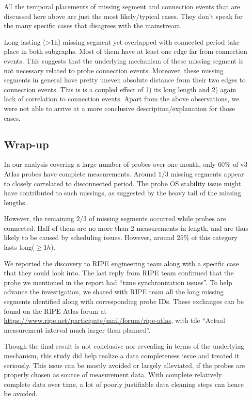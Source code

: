 All the temporal placements of missing segment and connection events that are discussed here above are just the most likely/typical cases. They don't speak for the many specific cases that disagrees with the mainstream.

Long lasting (>1h) missing segment yet overlapped with connected period take place in both subgraphs. 
Most of them have at least one edge far from connection events.
This suggests that the underlying mechanism of these missing segment is not necessary related to probe connection events.
Moreover, these missing segments in general have pretty uneven absolute distance from their two edges to connection events. 
This is is a coupled effect of 1) its long length and 2) again lack of correlation to connection events.
Apart from the above observations, we were not able to arrive at a more conclusive description/explanation for those cases.

\subsection*{Wrap-up}
In our analysis covering a large number of probes over one month, only 60\% of v3 Atlas probes have complete measurements. Around $1/3$ missing segments appear to closely correlated to disconnected period. The probe OS stability issue might have contributed to such missings, as suggested by the heavy tail of the missing lengths.

However, the remaining $2/3$ of missing segments occurred while probes are connected. 
Half of them are no more than 2 measurements in length, and are thus likely to be caused by scheduling issues. However, around $25\%$ of this category lasts long($\geq 1h$). 

We reported the discovery to RIPE engineering team along with a specific case that they could look into.
The last reply from RIPE team confirmed that the probe we mentioned in the report had ``time synchronization issues''. To help advance the investigation, we shared with RIPE team all the long missing segments identified along with corresponding probe IDs. These exchanges can be found on the RIPE Atlas forum at \url{https://www.ripe.net/participate/mail/forum/ripe-atlas}, with tile ``Actual measurement interval much larger than planned''.

Though the final result is not conclusive nor revealing in terms of the underlying mechanism, this study did help realize a data completeness issue and treated it seriously.
This issue can be mostly avoided or largely alleviated, if the probes are properly chosen as source of measurement data.
With complete relatively complete data over time, a lot of poorly justifiable data cleaning steps can hence be avoided.


